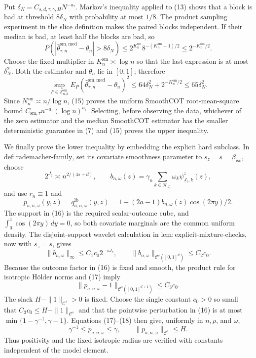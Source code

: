 Put \(\delta_N=C_{s,d,\tau,\gamma,H}N^{-a_\tau}\). Markov's inequality applied to (13) shows that a block is bad at threshold \(8\delta_N\) with probability at most \(1/8\). The product sampling experiment in the slice definition makes the paired blocks independent. If their median is bad, at least half the blocks are bad, so
\[
P\!\left(
|\widehat\theta^{\mathrm{sm,med}}_{\tau,n}-\theta_n|>8\delta_N
\right)
\le2^{K_n^{\mathrm{sm}}}8^{-(K_n^{\mathrm{sm}}+1)/2}
\le2^{-K_n^{\mathrm{sm}}/2}.
\tag{14}
\]
Choose the fixed multiplier in \(K_n^{\mathrm{sm}}\asymp\log n\) so that the last expression is at most \(\delta_N^2\). Both the estimator and \(\theta_n\) lie in \([0,1]\); therefore
\[
\sup_{P\in\mathcal S^{\mathrm{sm}}_{n,d}}
E_P(\widehat\theta^{\mathrm{sm,med}}_{\tau,n}-\theta_n)^2
\le64\delta_N^2+2^{-K_n^{\mathrm{sm}}/2}
\le65\delta_N^2.
\tag{15}
\]
Since \(N_n^{\mathrm{sm}}\asymp n/\log n\), (15) proves the uniform SmoothCOT root-mean-square bound \(C_{\mathrm{sm},\tau}n^{-a_\tau}(\log n)^{a_\tau}\). Selecting, before observing the data, whichever of the zero estimator and the median SmoothCOT estimator has the smaller deterministic guarantee in (7) and (15) proves the upper inequality.

We finally prove the lower inequality by embedding the explicit hard subclass. In \(\mathrm{def{:}rademacher\text{-}family}\), set its covariate smoothness parameter to \(s_z=s=\beta_{\mathrm{iso}}\), choose
\[
2^{J_z}\asymp n^{2/(4s+d)},
\qquad
b_{n,\omega}(z)=\gamma_n\sum_{k\in\mathcal K_{J_z}}\omega_k\psi^z_{J_z,k}(z),
\]
and use \(r_n\equiv1\) and
\[
p_{a,n,\omega}(y,z)=q_{a,n,\omega}^{\mathrm{lb}}(y,z)
=1+(2a-1)b_{n,\omega}(z)\cos(2\pi y)/2.
\tag{16}
\]
The support in (16) is the required scalar-outcome cube, and \(\int_0^1\cos(2\pi y)\,dy=0\), so both covariate marginals are the common uniform density. The disjoint-support wavelet calculation in \(\mathrm{lem{:}explicit\text{-}mixture\text{-}checks}\), now with \(s_z=s\), gives
\[
\|b_{n,\omega}\|_\infty\le C_1c_0 2^{-sJ_z},
\qquad
\|b_{n,\omega}\|_{\mathcal C^s([0,1]^d)}\le C_2c_0.
\tag{17}
\]
Because the outcome factor in (16) is fixed and smooth, the product rule for isotropic H\"older norms and (17) imply
\[
\|p_{a,n,\omega}-1\|_{\mathcal C^s([0,1]^{d+1})}
\le C_3c_0.
\tag{18}
\]
The slack \(H-\|1\|_{\mathcal C^s}>0\) is fixed. Choose the single constant \(c_0>0\) so small that \(C_3c_0\le H-\|1\|_{\mathcal C^s}\) and that the pointwise perturbation in (16) is at most \(\min\{1-\gamma^{-1},\gamma-1\}\). Equations (17)--(18) then give, uniformly in \(n,\rho\), and \(\omega\),
\[
\gamma^{-1}\le p_{a,n,\omega}\le\gamma,
\qquad
\|p_{a,n,\omega}\|_{\mathcal C^s}\le H.
\tag{19}
\]
Thus positivity and the fixed isotropic radius are verified with constants independent of the model element.

